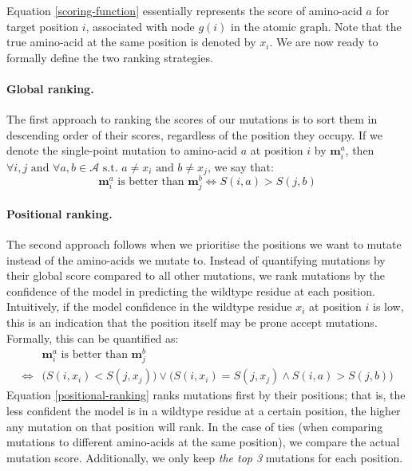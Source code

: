 Equation \ref{scoring-function} essentially represents the score of amino-acid $a$ for target position $i$, associated with node $g(i)$ in the atomic graph. Note that the true amino-acid at the same position is denoted by $x_i$. 
We are now ready to formally define the two ranking strategies. 

\paragraph{Global ranking.} The first approach to ranking the scores of our mutations is to sort them in descending order of their scores, regardless of the position they occupy. If we denote the single-point mutation to amino-acid $a$ at position $i$ by $\mathbf{m}_{i}^a$, then $\forall i,j\text{ and }\forall a,b\in \mathcal{A} \text{ s.t. } a \neq x_i \text{ and } b \neq x_j$, we say that:
\begin{equation}
    \mathbf{m}_{i}^a\text{ is better than }\mathbf{m}_{j}^b \iff S(i, a) > S(j, b)
\label{global-ranking}
\end{equation}

\paragraph{Positional ranking.} The second approach follows when we prioritise the positions we want to mutate instead of the amino-acids we mutate to. Instead of quantifying mutations by their global score compared to all other mutations, we rank mutations by the confidence of the model in predicting the wildtype residue at each position. Intuitively, if the model confidence in the wildtype residue $x_i$ at position $i$ is low, this is an indication that the position itself may be prone accept mutations. Formally, this can be quantified as:
\begin{equation}
\begin{aligned}
&\mathbf{m}_{i}^a\text{ is better than }\mathbf{m}_{j}^b \\ 
\iff &\Big(S(i, x_i) < S(j, x_j)\Big) \lor \Big(S(i, x_i) = S(j, x_j) \land S(i, a) > S(j, b)\Big)
\end{aligned}
\label{positional-ranking}
\end{equation}
Equation \ref{positional-ranking} ranks mutations first by their positions; that is, the less confident the model is in a wildtype residue at a certain position, the higher any mutation on that position will rank. In the case of ties (when comparing mutations to different amino-acids at the same position), we compare the actual mutation score. Additionally, we only keep \textit{the top 3} mutations for each position. 

